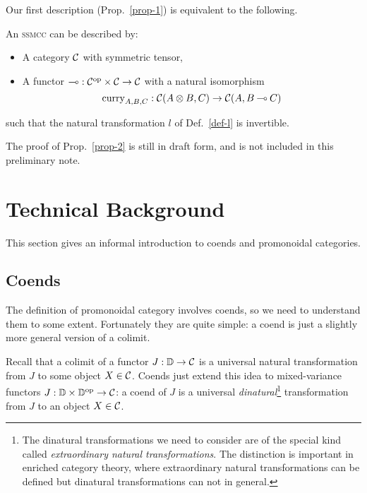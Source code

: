 \documentclass{robincs}
\newcommand\curry{\mathrm{curry}}
\newcommand\Lin[1][\C]{\mathrm{Lin}_{#1}}
\newcommand\SECC {\textsc{ssmcc}\xspace}
\begin{document}
Our first description (Prop.~\ref{prop-1}) is equivalent to the following.   
\begin{propn}\label{prop-2}
        An \SECC can be described by:
        \begin{itemize}
        \item A category $\mathcal{C}$ with symmetric tensor,
        \item A functor $\mathbin{\multimap}:\mathcal{C}^\mathrm{op}\times\mathcal{C}\to\mathcal{C}$ with a natural isomorphism
                \[
                        \curry_{A,B,C}:\C(A\tn B,C) \to \C(A, B\lolli C)
                \]
        \end{itemize}
        such that the natural transformation
        $l$ of Def.~\ref{def-l}
        is invertible.
\end{propn}
%
The proof of Prop.~\ref{prop-2} is still in draft form,
and is not included in this preliminary note.

\section{Technical Background}\label{s-bg}
This section gives an informal introduction to coends and
promonoidal categories.
\subsection{Coends}\label{s-coends}
The definition of promonoidal category involves coends, so we
need to understand them to some extent. Fortunately they are
quite simple: a coend is just a slightly more general version
of a colimit.

Recall that a colimit of a functor $J: \mathbb{D}\to\mathcal{C}$ is a universal natural
transformation from $J$ to some object $X\in\mathcal{C}$. Coends just
extend this idea to mixed-variance functors $J: \mathbb{D}\times \mathbb{D}^\mathrm{op}\to\mathcal{C}$:
a coend of $J$ is a universal \emph{dinatural}\footnote{
        The dinatural transformations we need to consider are
        of the special kind called \emph{extraordinary natural
        transformations}. The distinction is important in
        enriched category theory, where extraordinary natural
        transformations can be defined but dinatural transformations
        can not in general.
}
transformation from $J$ to an object $X\in\mathcal{C}$.
\end{document}
